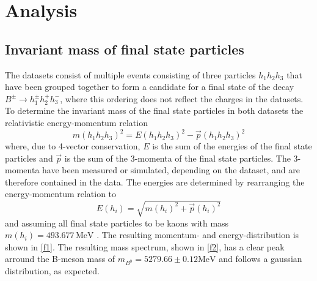 \section{Analysis}\label{sec:analysis}

\subsection{Invariant mass of final state particles}
The datasets consist of multiple events consisting of three particles $h_1 h_2 h_3$ that have been grouped together to form a candidate for a final state
of the decay $B^\pm \rightarrow h_1^\pm h_2^+ h_3^-$, where this ordering does not reflect the charges in the datasets.
To determine the invariant mass of the final state particles in both datasets the relativistic energy-momentum relation
\begin{equation}
  m(h_1 h_2 h_3)^2 = E(h_1 h_2 h_3)^2 - \vec{p}(h_1 h_2 h_3)^2
\end{equation}
where, due to 4-vector conservation, $E$ is the sum of the energies of the final state particles and $\vec{p}$ is the sum of the 3-momenta of the
final state particles. The 3-momenta have been measured or simulated, depending on the dataset, and are therefore contained in the data.
The energies are determined by rearranging the energy-momentum relation to
\begin{equation}
  E(h_i) = \sqrt{m(h_i)^2 + \vec{p}(h_i)^2}
\end{equation}
and assuming all final state particles to be kaons with mass $m(h_i) = 493.677 \, \si{\mega\eV}$ \cite{pdg}. The resulting momentum- and energy-distribution
is shown in \autoref{f1}. The resulting mass spectrum, shown in \autoref{f2}, has a clear peak arround the B-meson mass of
$m_{B^0} = 5279.66 \pm 0.12 \si{\mega\eV}$ \cite{pdg} and follows a gaussian distribution, as expected.


